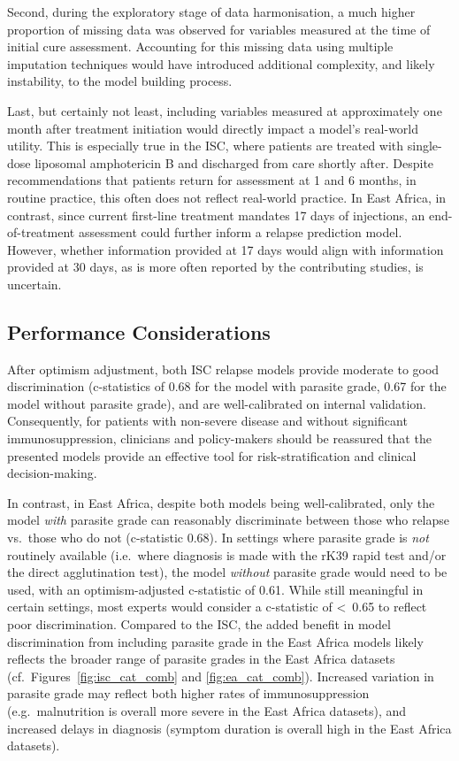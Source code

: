 Second, during the exploratory stage of data harmonisation, a much higher proportion of missing data was observed for variables measured at the time of initial cure assessment. Accounting for this missing data using multiple imputation techniques would have introduced additional complexity, and likely instability, to the model building process.

Last, but certainly not least, including variables measured at approximately one month after treatment initiation would directly impact a model's real-world utility. This is especially true in the ISC, where patients are treated with single-dose liposomal amphotericin B and discharged from care shortly after. Despite recommendations that patients return for assessment at 1 and 6 months, in routine practice, this often does not reflect real-world practice\cite{pareyn2025, chatterjee2025}. In East Africa, in contrast, since current first-line treatment mandates 17 days of injections, an end-of-treatment assessment could further inform a relapse prediction model. However, whether information provided at 17 days would align with information provided at 30 days, as is more often reported by the contributing studies, is uncertain.

\subsection{Performance Considerations}

After optimism adjustment, both ISC relapse models provide moderate to good discrimination (c-statistics of 0.68 for the model with parasite grade, 0.67 for the model without parasite grade), and are well-calibrated on internal validation. Consequently, for patients with non-severe disease and without significant immunosuppression, clinicians and policy-makers should be reassured that the presented models provide an effective tool for risk-stratification and clinical decision-making.

In contrast, in East Africa, despite both models being well-calibrated, only the model \textit{with} parasite grade can reasonably discriminate between those who relapse vs.\ those who do not (c-statistic 0.68). In settings where parasite grade is \textit{not} routinely available (i.e.\ where diagnosis is made with the rK39 rapid test and/or the direct agglutination test), the model \textit{without} parasite grade would need to be used, with an optimism-adjusted c-statistic of 0.61. While still meaningful in certain settings, most experts would consider a c-statistic of <~0.65 to reflect poor discrimination\cite{steyerberg2010}. Compared to the ISC, the added benefit in model discrimination from including parasite grade in the East Africa models likely reflects the broader range of parasite grades in the East Africa datasets (cf.\ Figures~\ref{fig:isc_cat_comb} and \ref{fig:ea_cat_comb}). Increased variation in parasite grade may reflect both higher rates of immunosuppression (e.g.\ malnutrition is overall more severe in the East Africa datasets), and increased delays in diagnosis (symptom duration is overall high in the East Africa datasets).

